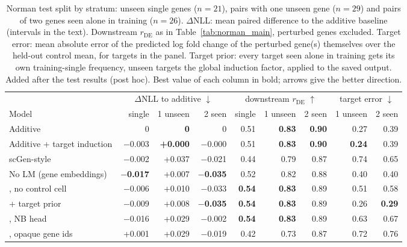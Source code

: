\begin{table}[t]
\centering
\setlength{\tabcolsep}{3.2pt}
\begin{tabular}{lrrrrrrrr}
\toprule
 & \multicolumn{3}{c}{$\Delta$NLL to additive $\downarrow$} & \multicolumn{3}{c}{downstream $r_{\mathrm{DE}}$ $\uparrow$} & \multicolumn{2}{c}{target error $\downarrow$} \\
\cmidrule(lr){2-4}\cmidrule(lr){5-7}\cmidrule(lr){8-9}
Model & single & 1 unseen & 2 seen & single & 1 unseen & 2 seen & 1 unseen & 2 seen \\
\midrule
Additive & 0 & \textbf{0} & 0 & 0.51 & \textbf{0.83} & \textbf{0.90} & 0.27 & 0.39 \\
Additive + target induction & $-$0.003 & \textbf{+0.000} & $-$0.000 & 0.51 & \textbf{0.83} & \textbf{0.90} & \textbf{0.24} & 0.39 \\
scGen-style & $-$0.002 & +0.037 & $-$0.021 & 0.44 & 0.79 & 0.87 & 0.74 & 0.65 \\
No LM (gene embeddings) & \textbf{$-$0.017} & +0.007 & \textbf{$-$0.035} & 0.52 & 0.82 & 0.88 & 0.40 & 0.40 \\
\rowcolor{ours}\cad{}, no control cell & $-$0.006 & +0.010 & $-$0.033 & \textbf{0.54} & \textbf{0.83} & 0.89 & 0.51 & 0.58 \\
\rowcolor{ours}\cad{} + target prior & $-$0.009 & +0.008 & \textbf{$-$0.035} & \textbf{0.54} & \textbf{0.83} & 0.89 & 0.26 & \textbf{0.29} \\
\rowcolor{ours}\cad{}, NB head & $-$0.016 & +0.029 & $-$0.002 & \textbf{0.54} & \textbf{0.83} & 0.89 & 0.63 & 0.67 \\
\rowcolor{ours}\cad{}, opaque gene ids & +0.001 & +0.029 & $-$0.019 & 0.42 & 0.73 & 0.87 & 0.72 & 0.76 \\
\bottomrule
\end{tabular}
\caption{Norman test split by stratum: unseen single genes ($n=21$), pairs with one unseen gene ($n=29$) and pairs of two genes seen alone in training ($n=26$). $\Delta$NLL: mean paired difference to the additive baseline (intervals in the text). Downstream $r_{\mathrm{DE}}$ as in Table~\ref{tab:norman_main}, perturbed genes excluded. Target error: mean absolute error of the predicted log fold change of the perturbed gene(s) themselves over the held-out control mean, for targets in the panel. Target prior: every target seen alone in training gets its own training-single frequency, unseen targets the global induction factor, applied to the saved \cad{} output. Added after the test results (post hoc). Best value of each column in bold; arrows give the better direction.}
\label{tab:strata}
\end{table}
